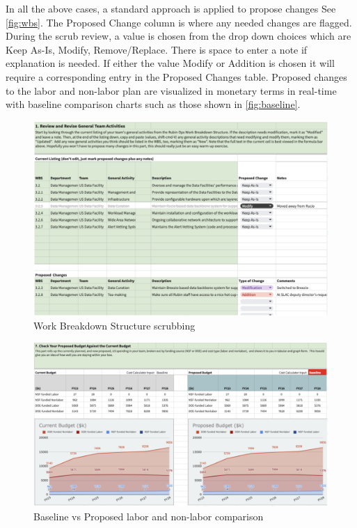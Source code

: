 In all the above cases, a standard approach is applied to propose changes See \autoref{fig:wbs}. The Proposed Change column is where any needed changes are flagged. During the scrub review, a value is chosen from the drop down choices which are Keep As-Is, Modify, Remove/Replace. There is space to enter a note if explanation is needed.
If either the value Modify or Addition is chosen it will require a corresponding entry in the Proposed Changes table.
Proposed changes to the labor and non-labor plan are visualized in monetary terms in real-time with baseline comparison charts such as those shown in \autoref{fig:baseline}.



\begin{figure}[h!]
\begin{centering}
\includegraphics[width=1.0\textwidth]{Figure4WorkBreakdownStructurescrubbing}
	\caption{ Work Breakdown Structure scrubbing
\label{fig:wbs}}
\end{centering}
\end{figure}

\begin{figure}[hb!]
\begin{centering}
\includegraphics[width=1.0\textwidth]{Figure5BaselinevsProposed}
	\caption{Baseline vs Proposed labor and non-labor comparison
\label{fig:baseline}}
\end{centering}
\end{figure}
